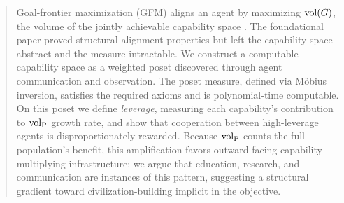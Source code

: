 \begin{abstract}
Goal-frontier maximization (GFM) aligns an agent by maximizing $\vol(G)$, the
    volume of the jointly achievable capability space \citep{lasser2026gfm}.
    The foundational paper proved structural alignment properties but left the
    capability space abstract and the measure intractable. We construct a
    computable capability space as a weighted poset discovered through agent
    communication and observation. The poset measure, defined via M\"{o}bius
    inversion, satisfies the required axioms and is polynomial-time computable.
    On this poset we define \emph{leverage}, measuring each capability's
    contribution to $\volL$ growth rate, and show that cooperation between
    high-leverage agents is disproportionately rewarded. Because $\volL$
    counts the full population's benefit, this amplification favors
    outward-facing capability-multiplying infrastructure; we argue that
    education, research, and communication are instances of this pattern,
    suggesting a structural gradient toward civilization-building implicit
    in the objective.
\end{abstract}
